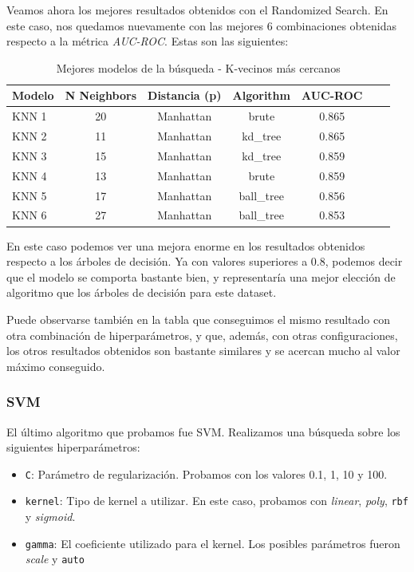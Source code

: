 Veamos ahora los mejores resultados obtenidos con el Randomized Search. En este caso, nos quedamos nuevamente con las mejores 
6 combinaciones obtenidas respecto a la métrica \textit{AUC-ROC}. Estas son las siguientes:

\begin{table}[H]
    \centering
    \begin{tabular}{|l|c|c|c|c|c|c|}
    \hline
    \textbf{Modelo} & \textbf{N Neighbors} & \textbf{Distancia (p)} & \textbf{Algorithm} & \textbf{AUC-ROC} \\
    \hline
    \rowcolor{yellow!30}
    KNN 1 & 20 & Manhattan & brute & 0.865 \\
    KNN 2 & 11 & Manhattan & kd\_tree & 0.865 \\
    KNN 3 & 15 & Manhattan & kd\_tree & 0.859 \\
    KNN 4 & 13 & Manhattan & brute & 0.859 \\
    KNN 5 & 17 & Manhattan & ball\_tree & 0.856 \\
    KNN 6 & 27 & Manhattan & ball\_tree & 0.853 \\
    \hline
    \end{tabular}
    \caption*{Mejores modelos de la búsqueda - K-vecinos más cercanos}
    \label{tab:hiperparametros-knn-tabla}
\end{table}

En este caso podemos ver una mejora enorme en los resultados obtenidos respecto a los árboles de decisión. Ya con valores
superiores a 0.8, podemos decir que el modelo se comporta bastante bien, y representaría una mejor elección de algoritmo que
los árboles de decisión para este dataset. 

Puede observarse también en la tabla que conseguimos el mismo resultado con otra combinación de hiperparámetros, y que, 
además, con otras configuraciones, los otros resultados obtenidos son bastante similares y se acercan mucho al valor máximo
conseguido.

\subsubsection*{SVM}

El último algoritmo que probamos fue SVM. Realizamos una búsqueda sobre los siguientes hiperparámetros:
\begin{itemize}
    \item \texttt{C}: Parámetro de regularización. Probamos con los valores 0.1, 1, 10 y 100.
    \item \texttt{kernel}: Tipo de kernel a utilizar. En este caso, probamos con \textit{linear}, \textit{poly}, \texttt{rbf} y \textit{sigmoid}.
    \item \texttt{gamma}: El coeficiente utilizado para el kernel. Los posibles parámetros fueron \textit{scale} y \texttt{auto} 
\end{itemize}


